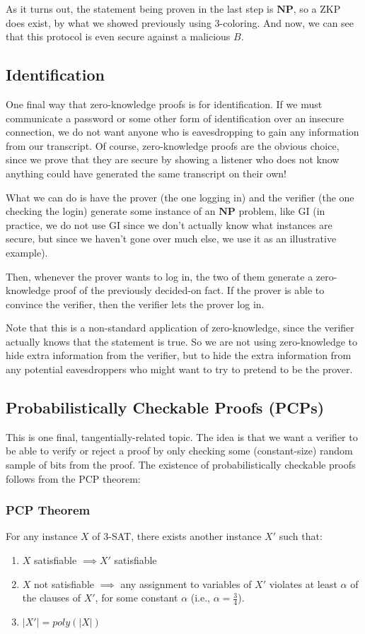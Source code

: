 \documentclass[11pt]{article}
\newcommand{\NP}{\mathbf{NP}}
\begin{document}
As it turns out, the statement being proven in the last step is \(\NP\), so a ZKP does exist, by what we showed previously using 3-coloring. And now, we can see that this protocol is even secure against a malicious \(B\).

\newpage
\subsection{Identification}
One final way that zero-knowledge proofs is for identification. If we must communicate a password or some other form of identification over an insecure connection, we do not want anyone who is eavesdropping to gain any information from our transcript. Of course, zero-knowledge proofs are the obvious choice, since we prove that they are secure by showing a listener who does not know anything could have generated the same transcript on their own!\medskip

What we can do is have the prover (the one logging in) and the verifier (the one checking the login) generate some instance of an \(\NP\) problem, like GI (in practice, we do not use GI since we don't actually know what instances are secure, but since we haven't gone over much else, we use it as an illustrative example).\smallskip

Then, whenever the prover wants to log in, the two of them generate a zero-knowledge proof of the previously decided-on fact. If the prover is able to convince the verifier, then the verifier lets the prover log in.\medskip

Note that this is a non-standard application of zero-knowledge, since the verifier actually knows that the statement is true. So we are not using zero-knowledge to hide extra information from the verifier, but to hide the extra information from any potential eavesdroppers who might want to try to pretend to be the prover.

\subsection{Probabilistically Checkable Proofs (PCPs)}
This is one final, tangentially-related topic. The idea is that we want a verifier to be able to verify or reject a proof by only checking some (constant-size) random sample of bits from the proof. The existence of probabilistically checkable proofs follows from the PCP theorem:

\subsubsection{PCP Theorem}
For any instance \(X\) of 3-SAT, there exists another instance \(X'\) such that:
\begin{enumerate}
\item \(X\) satisfiable \(\implies X'\) satisfiable
\item \(X\) not satisfiable \(\implies\) any assignment to variables of \(X'\) violates at least \(\alpha\) of the clauses of \(X'\), for some constant \(\alpha\) (i.e., \(\alpha=\frac{3}{4}\)).
\item \(|X'|=poly(|X|)\)
\end{enumerate}
\end{document}
